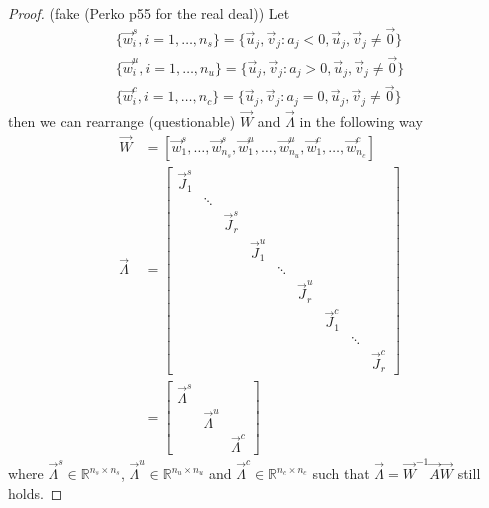 \begin{proof}
	(fake (Perko p55 for the real deal)) Let
	\begin{align*}
		\{\vec w_i^s, i = 1, \dotsc, n_s\} = \{\vec u_j, \vec v_j: a_j < 0, \vec u_j, \vec v_j \neq \vec 0\} \\
		\{\vec w_i^u, i = 1, \dotsc, n_u\} = \{\vec u_j, \vec v_j: a_j > 0, \vec u_j, \vec v_j \neq \vec 0\} \\
		\{\vec w_i^c, i = 1, \dotsc, n_c\} = \{\vec u_j, \vec v_j: a_j = 0, \vec u_j, \vec v_j \neq \vec 0\} 
	\end{align*}
	then we can rearrange (questionable) $\vec W$ and $\vec \Lambda$ in the following way
	\begin{align*}
		\vec W 			&= [\vec w_1^s, \dotsc, \vec w_{n_s}^s, \vec w_1^u, \dotsc, \vec w_{n_u}^u, \vec w_1^c, \dotsc, \vec w_{n_c}^c] \\
		\vec \Lambda 	&= 
							\begin{bmatrix}
								\vec J_1^s \\
											& \ddots \\
											&			& \vec J_r^s \\
											&			&				& \vec J_1^u \\
											&			&				&				& \ddots \\
											&			&				&				&			& \vec J_r^u \\
											&			&				&				&			&				& \vec J_1^c \\
											&			&				&				&			&				&				& \ddots \\
											&			&				&				&			&				&				&			& \vec J_r^c
							\end{bmatrix} \\
						&=
							\begin{bmatrix}
								\vec \Lambda^s \\
												& \vec \Lambda^u \\
												&					& \vec \Lambda^c
							\end{bmatrix}
	\end{align*}
	where $\vec \Lambda^s \in \mathbb R^{n_s \times n_s}$, $\vec \Lambda^u \in \mathbb R^{n_u \times n_u}$ and $\vec \Lambda^c \in \mathbb R^{n_c \times n_c}$ such that $\vec \Lambda = \vec W^{-1} \vec A \vec W$ still holds.


\end{proof}
